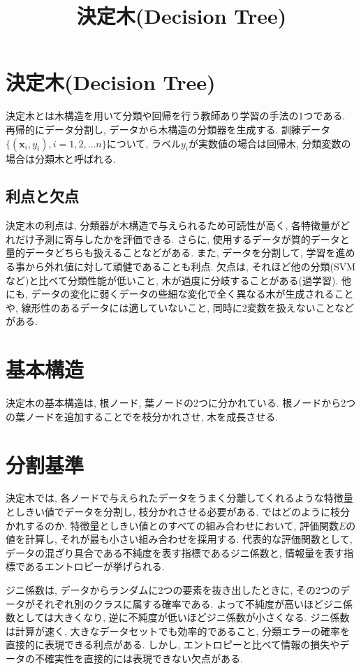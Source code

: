 \documentclass[dvipdfmx, 10pt]{jsarticle}
\title{\textbf{決定木(Decision Tree)}}
\author{}
\date{}
\begin{document}
\maketitle

\section*{決定木(Decision Tree)}
決定木とは木構造を用いて分類や回帰を行う教師あり学習の手法の1つである. 
再帰的にデータ分割し, データから木構造の分類器を生成する. 
訓練データ\(\{(\mathbf{x}_i, y_i), i=1, 2, \dots n\}\)について, 
ラベル\(y_i\)が実数値の場合は回帰木, 分類変数の場合は分類木と呼ばれる. 

\subsection*{利点と欠点}
決定木の利点は, 分類器が木構造で与えられるため可読性が高く, 各特徴量がどれだけ予測に寄与したかを評価できる. 
さらに, 使用するデータが質的データと量的データどちらも扱えることなどがある.  
また, データを分割して, 学習を進める事から外れ値に対して頑健であることも利点. 
欠点は, それほど他の分類(SVMなど)と比べて分類性能が低いこと, 木が過度に分岐することがある(過学習). 
他にも, データの変化に弱くデータの些細な変化で全く異なる木が生成されることや, 線形性のあるデータには適していないこと, 
同時に2変数を扱えないことなどがある. 

\section*{基本構造}
決定木の基本構造は, 根ノード, 葉ノードの2つに分かれている. 
根ノードから2つの葉ノードを追加することでを枝分かれさせ, 木を成長させる. 

\section*{分割基準}
決定木では, 各ノードで与えられたデータをうまく分離してくれるような特徴量としきい値でデータを分割し, 枝分かれさせる必要がある. 
ではどのように枝分かれするのか. 特徴量としきい値とのすべての組み合わせにおいて, 評価関数\(E\)の値を計算し, 
それが最も小さい組み合わせを採用する. 
代表的な評価関数として, データの混ざり具合である不純度を表す指標であるジニ係数と, 情報量を表す指標であるエントロピーが挙げられる. 

ジニ係数は, データからランダムに2つの要素を抜き出したときに, その2つのデータがそれぞれ別のクラスに属する確率である. 
よって不純度が高いほどジニ係数としては大きくなり, 逆に不純度が低いほどジニ係数が小さくなる. 
ジニ係数は計算が速く, 大きなデータセットでも効率的であること, 分類エラーの確率を直接的に表現できる利点がある. 
しかし, エントロピーと比べて情報の損失やデータの不確実性を直接的には表現できない欠点がある. 
\end{document}

